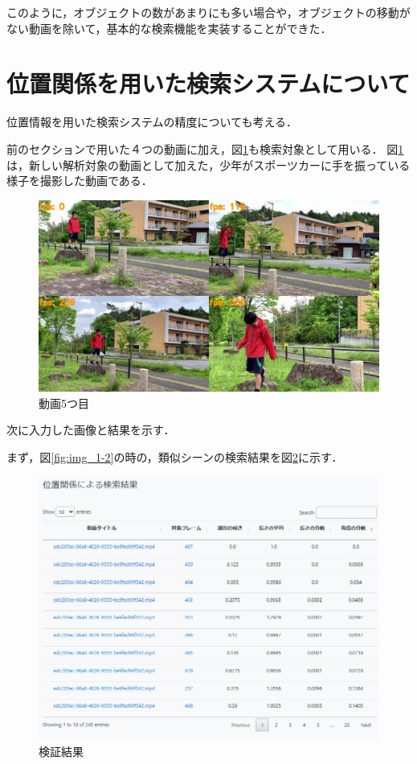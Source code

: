 \documentclass[a4j,12pt,dvipdfmx]{jreport}
\begin{document}
このように，オブジェクトの数があまりにも多い場合や，オブジェクトの移動がない動画を除いて，基本的な検索機能を実装することができた．

\section{位置関係を用いた検索システムについて}
位置情報を用いた検索システムの精度についても考える．

前のセクションで用いた４つの動画に加え，図\ref{fig:movie5}も検索対象として用いる．
図\ref{fig:movie5}は，新しい解析対象の動画として加えた，少年がスポーツカーに手を振っている様子を撮影した動画である．
\begin{figure}[b]
  \centering
  \includegraphics[width=13cm]{image/5_result.jpg}
  \caption{動画5つ目}
  \label{fig:movie5}
\end{figure}

次に入力した画像と結果を示す．

まず，図\ref{fig:img_1-2}の時の，類似シーンの検索結果を図\ref{fig:img_2-1}に示す．
\begin{figure}[b]
  \centering
  \includegraphics[width=13cm]{image/result_2_1.jpg}
  \caption{検証結果}
  \label{fig:img_2-1}
\end{figure}
\end{document}
